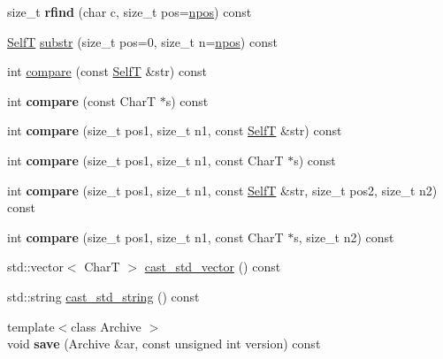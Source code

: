 \begin{CompactItemize}
\item 
\hypertarget{classdeque__string_3b18a54a5bd730202c4d64d658f58707}{
size\_\-t \textbf{rfind} (char c, size\_\-t pos=\hyperlink{classdeque__string_b2a5692bbdd473486ce93df0cadd2540}{npos}) const }
\label{classdeque__string_3b18a54a5bd730202c4d64d658f58707}

\item 
\hyperlink{classdeque__string}{SelfT} \hyperlink{classdeque__string_83a5b6ab306f888837fd3917acf59f0b}{substr} (size\_\-t pos=0, size\_\-t n=\hyperlink{classdeque__string_b2a5692bbdd473486ce93df0cadd2540}{npos}) const 
\item 
int \hyperlink{classdeque__string_703af7d90146d6f0589d5a778e488ebf}{compare} (const \hyperlink{classdeque__string}{SelfT} \&str) const 
\item 
\hypertarget{classdeque__string_77ea81c5f1d0b3ce9be883aec9b928c1}{
int \textbf{compare} (const CharT $\ast$s) const }
\label{classdeque__string_77ea81c5f1d0b3ce9be883aec9b928c1}

\item 
\hypertarget{classdeque__string_215c61ad005a25543d096acf1c5f76f7}{
int \textbf{compare} (size\_\-t pos1, size\_\-t n1, const \hyperlink{classdeque__string}{SelfT} \&str) const }
\label{classdeque__string_215c61ad005a25543d096acf1c5f76f7}

\item 
\hypertarget{classdeque__string_da7eb005c8a8fa493d135780a4ac7617}{
int \textbf{compare} (size\_\-t pos1, size\_\-t n1, const CharT $\ast$s) const }
\label{classdeque__string_da7eb005c8a8fa493d135780a4ac7617}

\item 
\hypertarget{classdeque__string_1c963d2ad2feb84a4ceed66ab92f49dd}{
int \textbf{compare} (size\_\-t pos1, size\_\-t n1, const \hyperlink{classdeque__string}{SelfT} \&str, size\_\-t pos2, size\_\-t n2) const }
\label{classdeque__string_1c963d2ad2feb84a4ceed66ab92f49dd}

\item 
\hypertarget{classdeque__string_5dc94c0c3023c5961d4672bb702df22b}{
int \textbf{compare} (size\_\-t pos1, size\_\-t n1, const CharT $\ast$s, size\_\-t n2) const }
\label{classdeque__string_5dc94c0c3023c5961d4672bb702df22b}

\item 
std::vector$<$ CharT $>$ \hyperlink{classdeque__string_bdea4c4f98fb0c2f65a138cdef8d0331}{cast\_\-std\_\-vector} () const 
\item 
std::string \hyperlink{classdeque__string_cf24d0ac8c5ec359d3a5732efdd0b98b}{cast\_\-std\_\-string} () const 
\item 
\hypertarget{classdeque__string_131c6a969795bc9021a0d2200eb6e932}{
{\footnotesize template$<$class Archive $>$ }\\void \textbf{save} (Archive \&ar, const unsigned int version) const }
\label{classdeque__string_131c6a969795bc9021a0d2200eb6e932}


\end{CompactItemize}
